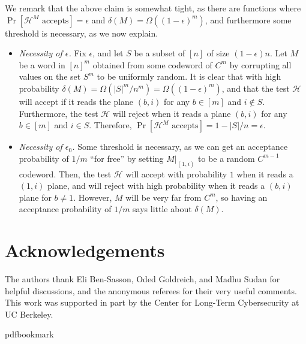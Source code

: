 \documentclass[11pt]{article}
\numberwithin{equation}{section}
\theoremstyle{definition}
\theoremstyle{plain}
\theoremstyle{plain}
\newcommand{\colored}{}
\newcommand{\reldist}{\colored{\delta}}
\newcommand{\tester}{\colored{\mathcal H}} %
\newcommand{\blocklength}{\colored{n}} %
\newcommand{\testerinput}{\colored{M}} %
\newcommand\abs[1]{\colored{\left|#1\right|}}
\begin{document}
We remark that the above claim is somewhat tight, as there are functions where ${\Pr[\tester^{\testerinput} \text{ accepts}] = \epsilon}$ and $\reldist(\testerinput) = \Omega((1- \epsilon)^m)$, and furthermore some threshold is necessary, as we now explain.
\begin{itemize}

  \item \emph{Necessity of $\epsilon$.}
  Fix $\epsilon$, and let $S$ be a subset of $[\blocklength]$ of size $(1-\epsilon) n$. Let $\testerinput$ be a word in $[\blocklength]^m$ obtained from some codeword of $C^m$ by corrupting all values on the set $S^{m}$ to be uniformly random. It is clear that with high probability $\reldist(\testerinput) = \Omega(\abs{S}^m/\blocklength^m) = \Omega((1- \epsilon)^m)$, and that the test $\tester$ will accept if it reads the plane $(b, i)$ for any $b \in [m]$ and $i \notin S$. Furthermore, the test $\tester$ will reject when it reads a plane $(b,i)$ for any $b \in [m]$ and $i \in S$. Therefore, $\Pr[\tester^{\testerinput} \text{ accepts}] = 1 - \abs{S}/\blocklength = \epsilon$.

  \item \emph{Necessity of $\epsilon_0$.}
Some threshold is necessary, as we can get an acceptance probability of $1/m$ ``for free'' by setting $\testerinput |_{(1,i)}$ to be a random $C^{m-1}$ codeword. Then, the test $\tester$ will accept with probability $1$ when it reads a $(1,i)$ plane, and will reject with high probability when it reads a $(b,i)$ plane for $b \ne 1$. However, $\testerinput$ will be very far from $C^m$, so having an acceptance probability of $1/m$ says little about $\reldist(\testerinput)$.
\end{itemize}



%
%
%
\section*{Acknowledgements}

The authors thank Eli Ben-Sasson, Oded Goldreich, and Madhu Sudan for helpful discussions, and the anonymous referees for their very useful comments. This work was supported in part by the Center for Long-Term Cybersecurity at UC Berkeley.

\nocite{conf-version}


\newcommand{\sortsilent}[1]{}
\providecommand{\bibhead}[1]{}
\expandafter\ifx\csname pdfbookmark\endcsname\relax%
  \providecommand{\tocrefpdfbookmark}{}
\else\providecommand{\tocrefpdfbookmark}{%
   \hypertarget{tocreferences}{}%
   \pdfbookmark[1]{References}{tocreferences}}%
\fi
\end{document}
